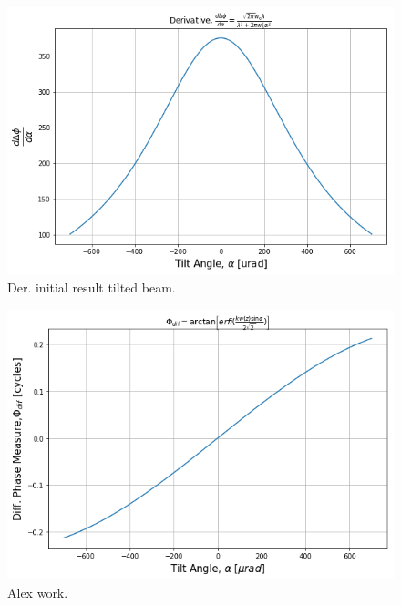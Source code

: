 \documentclass[aps,twoside,secnumarabic,balancelastpage,amsmath,amssymb,nofootinbib,hyperref=pdftex]{revtex4}
\begin{document}
\begin{figure}
	\centering
		\includegraphics[scale=.65]{tilt-initial-der}
		\caption{Der. initial result tilted beam.}
		\label{fig:6}
\end{figure}

\clearpage

\begin{figure}
	\centering
		\includegraphics[scale=.65]{tilt-al}
		\caption{Alex work.}
		\label{fig:7}
\end{figure}
\end{document}
